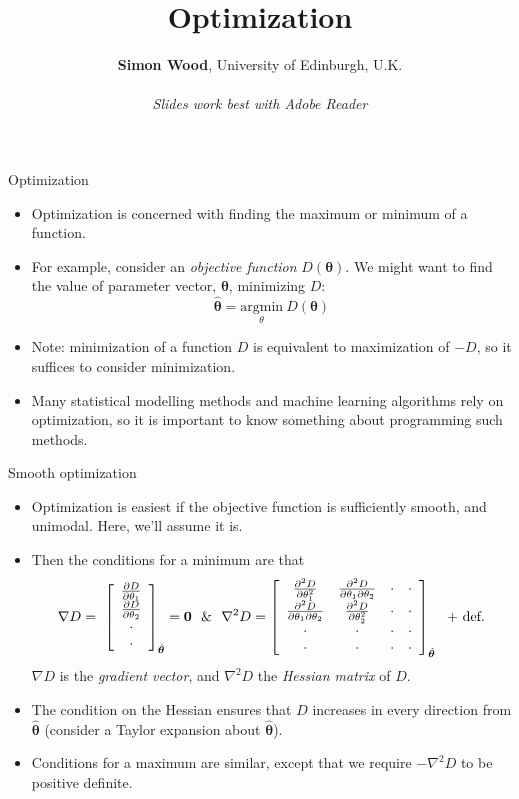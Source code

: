 \documentclass{beamer}
\title{Optimization}
\author{{\bf Simon Wood}, University of Edinburgh, U.K.\\~\\ {\em Slides work best with Adobe Reader}}
\date{}
\newcommand{\pdif}[2]{\frac{\partial #1}{\partial #2}}
\newcommand{\pddif}[3]{\frac{\partial^2 #1}{\partial #2 \partial #3}}
\newcommand{\bmat}[1]{\left [ \begin{array}{#1}}
\newcommand{\emat}{\end{array}\right ]}
\begin{document}
\begin{frame}
\titlepage
\end{frame}


\begin{frame}{Optimization}
\begin{itemize}
\item Optimization is concerned with finding the maximum or minimum of a function. 
\item For example, consider an {\em objective function} $D({\bm \theta})$. We might want to find the value of parameter vector, $\bm \theta$,  minimizing $D$:
$$
\hat {\bm \theta} = \underset{\theta}{\text{argmin}} ~ D({\bm \theta})
$$
\item Note: minimization of a function $D$ is equivalent to maximization of $-D$, so it suffices to consider minimization. 
\item Many statistical modelling methods and machine learning algorithms rely on optimization, so it is important to know something about programming such methods.
\end{itemize}
\end{frame}

\begin{frame}{Smooth optimization}
\begin{itemize}
\item Optimization is easiest if the objective function is sufficiently smooth, and unimodal. Here, we'll assume it is. 
\item Then the conditions for a minimum are that
{\small $$
\nabla D = \ \bmat{c} \pdif{D}{\theta_1}\\ \pdif{D}{\theta_2}\\ \cdot \\ \cdot \emat_{\hat {\bm \theta}} = {\bf 0}~~ \& ~~
\nabla^2 D = \bmat{cccc}  
\pdif{^2D}{\theta_1^2} & \pddif{D}{\theta_1}{\theta_2} & \cdot & \cdot \\
\pddif{D}{\theta_1}{\theta_2} & \pdif{^2D}{\theta_2^2} & \cdot & \cdot \\
\cdot & \cdot& \cdot & \cdot \\\cdot & \cdot& \cdot & \cdot \\
\emat_{\hat {\bm \theta}} ~~ \text{+ def.}
$$}
$\nabla D$ is the {\em gradient vector}, and $\nabla^2 D$ the {\em Hessian matrix} of $D$.
\item The condition on the Hessian ensures that $D$ increases in every direction from $\hat {\bm \theta}$ (consider a Taylor expansion about $\hat {\bm \theta}$).
\item Conditions for a maximum are similar, except that we require $ - \nabla^2 D$ to be positive definite.
\end{itemize}
\end{frame}
\end{document}
